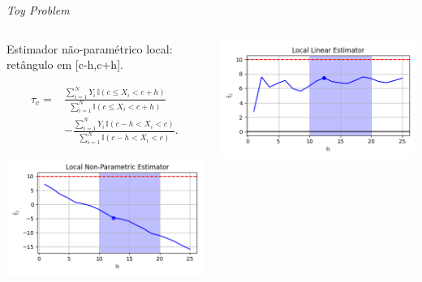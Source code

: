 \documentclass[aspectratio=1610, 10pt]{beamer}
\begin{document}
\begin{frame}{\emph{Toy Problem}}
    \begin{columns}[T] %
		\begin{column}{0.48\linewidth} %
            Estimador não-paramétrico local: retângulo em [c-h,c+h].

            \begin{align*}
                \hat{\tau}_c =& \frac{\sum_{i=1}^N Y_i \, \mathbb{I}(c \leq X_i < c+h)}{\sum_{i=1}^N \mathbb{I}(c \leq X_i < c+h)} \\
                &- \frac{\sum_{i=1}^N Y_i \, \mathbb{I}(c-h < X_i < c)}{\sum_{i=1}^N \mathbb{I}(c-h < X_i < c)}.
            \end{align*}

            \vspace{-0.2cm}
            \includegraphics[width=\linewidth]{toy/LocalNonParam.png}
		\end{column}
		\begin{column}{0.48\linewidth}

            \vspace{-0.3cm}
            \includegraphics[width=\linewidth]{toy/LocalLinear.png}
            \vspace{-0.7cm}


\end{column}
\end{columns}
\end{frame}
\end{document}
